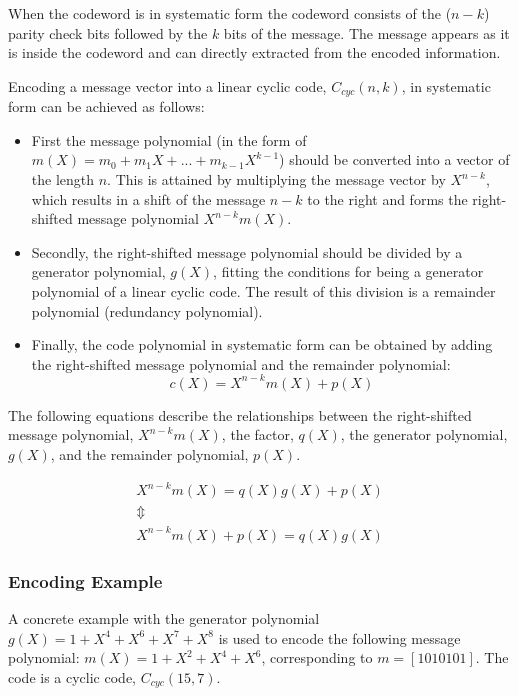 \documentclass[Main]{subfiles}
\begin{document}
When the codeword is in systematic form the codeword consists of the ($n - k$) parity check bits followed by the $k$ bits of the message. The message appears as it is inside the codeword and can directly extracted from the encoded information. 

Encoding a message vector into a linear cyclic code, $C_{cyc}(n,k)$, in systematic form can be achieved as follows:

\begin{itemize}
\item First the message polynomial (in the form of $m(X) = m_{0} + m_{1}X+...+m_{k-1}X^{k-1}$) should be converted into a vector of the length $n$. 
This is attained by multiplying the message vector by $X^{n-k}$, which results in a shift of the message $n-k$ to the right and forms the right-shifted message polynomial $X^{n-k}m(X)$.

\item Secondly, the right-shifted message polynomial should be divided by a generator polynomial, $g(X)$, fitting the conditions for being a generator polynomial of a linear cyclic code. 
The result of this division is a remainder polynomial (redundancy polynomial).

\item Finally, the code polynomial in systematic form can be obtained by adding the right-shifted message polynomial and the remainder polynomial: 
\begin{equation}
c(X) = X^{n-k}m(X)+p(X)
\label{eq:code polynomail formular}
\end{equation}
\end{itemize}
The following equations describe the relationships between the right-shifted message polynomial, $X^{n-k}m(X)$, the factor, $q(X)$, the generator polynomial, $g(X)$, and the remainder polynomial, $p(X)$.  

\begin{eqnarray}
X^{n-k}m(X) = q(X)g(X)+p(X)\\
\Updownarrow \nonumber \\
\label{eq:encoding}
X^{n-k}m(X)+p(X) = q(X)g(X)
\end{eqnarray}

\subsubsection{Encoding Example}
\noindent A concrete example with the generator polynomial $g(X)=1+X^4+X^6+X^7+X^8$ is used to encode the following message polynomial:
$m(X)=1+X^2+X^4+X^6$, corresponding to $m=[1010101]$. The code is a cyclic code, $C_{cyc}(15,7)$.
\end{document}
